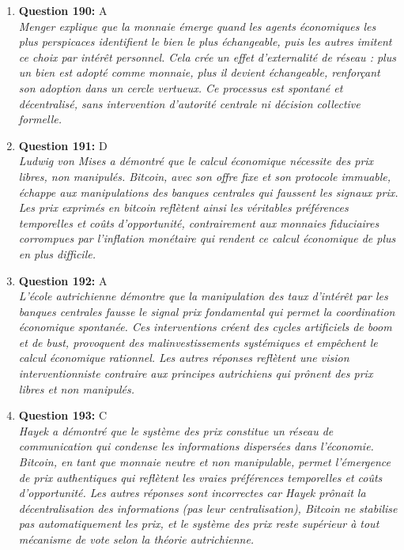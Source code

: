 \documentclass[12pt,a4paper]{article}
\begin{document}
\begin{enumerate}
\item \textbf{Question 190:} A
\\ \textit{Menger explique que la monnaie émerge quand les agents économiques les plus perspicaces identifient le bien le plus échangeable, puis les autres imitent ce choix par intérêt personnel. Cela crée un effet d'externalité de réseau : plus un bien est adopté comme monnaie, plus il devient échangeable, renforçant son adoption dans un cercle vertueux. Ce processus est spontané et décentralisé, sans intervention d'autorité centrale ni décision collective formelle.}

\item \textbf{Question 191:} D
\\ \textit{Ludwig von Mises a démontré que le calcul économique nécessite des prix libres, non manipulés. Bitcoin, avec son offre fixe et son protocole immuable, échappe aux manipulations des banques centrales qui faussent les signaux prix. Les prix exprimés en bitcoin reflètent ainsi les véritables préférences temporelles et coûts d'opportunité, contrairement aux monnaies fiduciaires corrompues par l'inflation monétaire qui rendent ce calcul économique de plus en plus difficile.}

\item \textbf{Question 192:} A
\\ \textit{L'école autrichienne démontre que la manipulation des taux d'intérêt par les banques centrales fausse le signal prix fondamental qui permet la coordination économique spontanée. Ces interventions créent des cycles artificiels de boom et de bust, provoquent des malinvestissements systémiques et empêchent le calcul économique rationnel. Les autres réponses reflètent une vision interventionniste contraire aux principes autrichiens qui prônent des prix libres et non manipulés.}

\item \textbf{Question 193:} C
\\ \textit{Hayek a démontré que le système des prix constitue un réseau de communication qui condense les informations dispersées dans l'économie. Bitcoin, en tant que monnaie neutre et non manipulable, permet l'émergence de prix authentiques qui reflètent les vraies préférences temporelles et coûts d'opportunité. Les autres réponses sont incorrectes car Hayek prônait la décentralisation des informations (pas leur centralisation), Bitcoin ne stabilise pas automatiquement les prix, et le système des prix reste supérieur à tout mécanisme de vote selon la théorie autrichienne.}


\end{enumerate}
\end{document}
